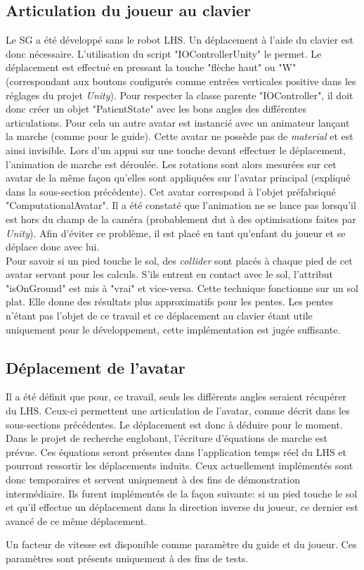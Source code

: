 	\subsection*{Articulation du joueur au clavier}
		Le SG a été développé sans le robot LHS. Un déplacement à l'aide du clavier est donc nécessaire.%
		L'utilisation du script "IOControllerUnity" le permet. Le déplacement est effectué en pressant la touche "flèche haut" ou "W" (correspondant aux boutons configurés comme entrées verticales positive dans les réglages du projet \textit{Unity}). Pour respecter la classe parente "IOController", il doit donc créer un objet "PatientState" avec les bons angles des différentes articulations. Pour cela un autre avatar est instancié avec un animateur lançant la marche (comme pour le guide). Cette avatar ne possède pas de \textit{material} et est ainsi invisible. Lors d'un appui sur une touche devant effectuer le déplacement, l'animation de marche est déroulée. Les rotations sont alors mesurées sur cet avatar de la même façon qu'elles sont appliquées sur l'avatar principal (expliqué dans la sous-section précédente). Cet avatar correspond à l'objet préfabriqué "ComputationalAvatar". Il a été constaté que l'animation ne se lance pas lorsqu'il est hors du champ de la caméra (probablement dut à des optimisations faites par \textit{Unity}). Afin d'éviter ce problème, il est placé en tant qu'enfant du joueur et se déplace donc avec lui.
		\\
		
		Pour savoir si un pied touche le sol, des \textit{collider} sont placés à chaque pied de cet avatar servant pour les calculs. S'ils entrent en contact avec le sol, l'attribut "isOnGround" est mis à "vrai" et vice-versa. Cette technique fonctionne sur un sol plat. Elle donne des résultats plus approximatifs pour les pentes. Les pentes n'étant pas l'objet de ce travail et ce déplacement au clavier étant utile uniquement pour le développement, cette implémentation est jugée suffisante.
		
	\subsection*{Déplacement de l'avatar}
		Il a été définit que pour, ce travail, seuls les différents angles seraient récupérer du LHS. Ceux-ci permettent une articulation de l'avatar, comme décrit dans les sous-sections précédentes. Le déplacement est donc à déduire pour le moment. Dans le projet de recherche englobant, l'écriture d'équations de marche est prévue. Ces équations seront présentes dans l'application temps réel du LHS et pourront ressortir les déplacements induits. Ceux actuellement implémentés sont donc temporaires et servent uniquement à des fins de démonstration intermédiaire. Ils furent implémentés de la façon suivante: si un pied touche le sol et qu'il effectue un déplacement dans la direction inverse du joueur, ce dernier est avancé de ce même déplacement.
		
		Un facteur de vitesse est disponible comme paramètre du guide et du joueur. Ces paramètres sont présents uniquement à des fins de tests.
		